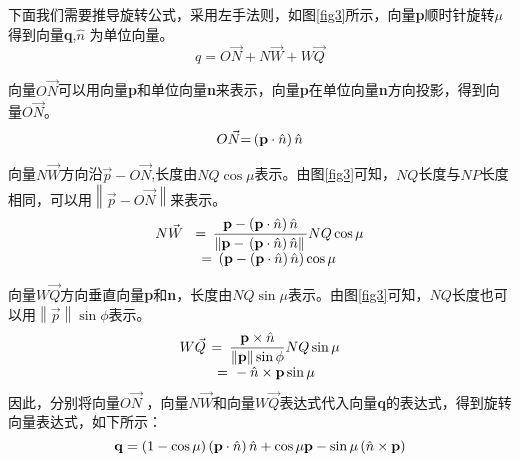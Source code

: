 下面我们需要推导旋转公式，采用左手法则，如图\ref{fig3}所示，向量{\bf{p}}顺时针旋转$\mu$得到向量{\bf{q}},$\hat n$ 为单位向量。
\begin{equation}\label{2}
q = O\vec N + N\vec W + W\vec Q
\end{equation}

向量$O\vec N$可以用向量{\bf{p}}和单位向量{\bf{n}}来表示，向量{\bf{p}}在单位向量{\bf{n}}方向投影，得到向量$O\vec N$。
\[O\vec N{\rm{ = }}\left( {{\bf{p}} \cdot \hat n} \right)\hat n\]

向量$N\vec W$方向沿$\vec p - O\vec N$,长度由$NQ\cos \mu $表示。由图\ref{fig3}可知，$NQ$长度与$NP$长度相同，可以用$\left\| {\vec p - \left. {O\vec N} \right\|} \right.$来表示。
\[\begin{array}{l}
\displaystyle{N\vec W{\kern 1pt} {\kern 1pt} {\kern 1pt} {\kern 1pt} {\kern 1pt} {\kern 1pt}  = {\kern 1pt} {\kern 1pt} \frac{{{\bf{p}} - \left( {{\bf{p}} \cdot \hat n} \right)\hat n}}{{\left\| {{\bf{p}} - \left. {\left( {{\bf{p}} \cdot \hat n} \right)\hat n} \right\|} \right.}}}NQ\cos \mu \\
{\kern 1pt} {\kern 1pt} {\kern 1pt} {\kern 1pt} {\kern 1pt} {\kern 1pt} {\kern 1pt} {\kern 1pt} {\kern 1pt} {\kern 1pt} {\kern 1pt} {\kern 1pt} {\kern 1pt} {\kern 1pt} {\kern 1pt} {\kern 1pt} {\kern 1pt} {\kern 1pt} {\kern 1pt} {\kern 1pt} {\kern 1pt} {\kern 1pt} {\kern 1pt} {\kern 1pt} {\kern 1pt} {\kern 1pt} {\kern 1pt} {\kern 1pt} {\kern 1pt} {\kern 1pt} {\kern 1pt} {\kern 1pt} {\kern 1pt} {\rm{ = }}{\kern 1pt} {\kern 1pt} {\kern 1pt} \left( {{\bf{p}} - \left( {{\bf{p}} \cdot \hat n} \right)\hat n} \right)\cos \mu
\end{array}\]

向量$W\vec Q$方向垂直向量{\bf{p}}和{\bf{n}}，长度由$NQ\sin \mu $表示。由图\ref{fig3}可知，$NQ$长度也可以用$\left\| {\vec p} \right\|\sin \phi $表示。
\[\begin{array}{l}
\displaystyle{W\vec Q{\kern 1pt} {\kern 1pt} {\kern 1pt} {\kern 1pt} {\rm{ = }}{\kern 1pt} {\kern 1pt} {\kern 1pt} {\kern 1pt} {\kern 1pt} \frac{{{\bf{p}} \times \hat n}}{{\left\| {\bf{p}} \right\|\sin \phi }}}NQ\sin \mu \\
{\kern 1pt} {\kern 1pt} {\kern 1pt} {\kern 1pt} {\kern 1pt} {\kern 1pt} {\kern 1pt} {\kern 1pt} {\kern 1pt} {\kern 1pt} {\kern 1pt} {\kern 1pt} {\kern 1pt} {\kern 1pt} {\kern 1pt} {\kern 1pt} {\kern 1pt} {\kern 1pt} {\kern 1pt} {\kern 1pt} {\kern 1pt} {\kern 1pt} {\kern 1pt} {\kern 1pt}  = {\kern 1pt}  - \hat n \times {\bf{p}}\sin \mu
\end{array}\]
因此，分别将向量$O\vec N$ ，向量$N\vec W$和向量$W\vec Q$表达式代入向量{\bf{q}}的表达式，得到旋转向量表达式，如下所示：
\begin{equation}\label{3}
{\bf{q}} = \left( {1 - \cos \mu } \right)\left( {{\bf{p}} \cdot \hat n} \right)\hat n + \cos \mu {\bf{p}} - \sin \mu \left( {\hat n \times {\bf{p}}} \right)
\end{equation}
